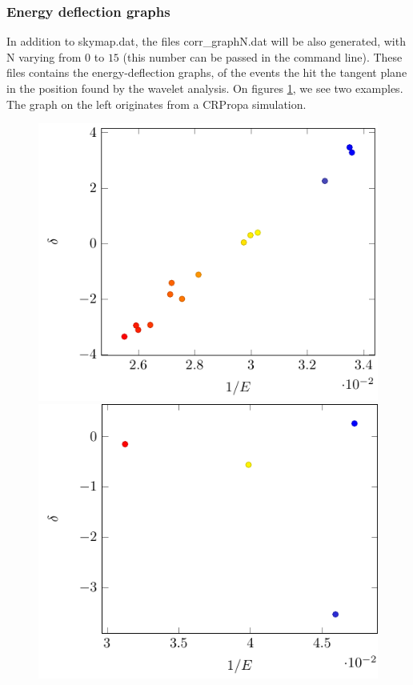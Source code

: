 \documentclass[12pt]{article}
\begin{document}
\subsubsection{Energy deflection graphs}
In addition to skymap.dat, the files {\color{textcolor}corr\_graphN.dat} will be also generated, 
with N varying from $0$ to $15$ (this number can be passed in the command line). These files contains the energy-deflection graphs,
of the events the hit the tangent plane in the position found by the wavelet
analysis. On figures \ref{deflections}, we see two examples. The graph on the left
originates from a CRPropa simulation. \\
\begin{figure}
\centering
\includegraphics[scale=0.8]{fig/corr_graph.pdf} 
\includegraphics[scale=0.8]{fig/corr_graph-sim.pdf}
\label{deflections}
\end{figure}
\end{document}
